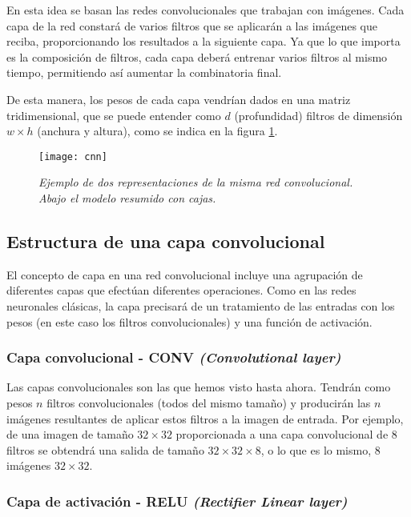 En esta idea se basan las redes convolucionales que trabajan con imágenes. Cada capa de la red constará de varios filtros que se aplicarán a las imágenes que reciba, proporcionando los resultados a la siguiente capa. Ya que lo que importa es la composición de filtros, cada capa deberá entrenar varios filtros al mismo tiempo, permitiendo así aumentar la combinatoria final.

De esta manera, los pesos de cada capa vendrían dados en una matriz tridimensional, que se puede entender como $d$ (profundidad) filtros de dimensión  $w \times h$ (anchura y altura), como se indica en la figura \ref{cnn_basic}.

\begin{figure}
    \centering
    \caption{\textit{Ejemplo de dos representaciones de la misma red convolucional. Abajo el modelo resumido con cajas.}}
  \label{cnn_basic}
  \texttt{[image: cnn]}
\end{figure}


\subsection{Estructura de una capa convolucional}

El concepto de capa en una red convolucional incluye una agrupación de diferentes capas que efectúan diferentes operaciones. Como en las redes neuronales clásicas, la capa precisará de un tratamiento de las entradas con los pesos (en este caso los filtros convolucionales) y una función de activación.

\subsubsection{Capa convolucional - CONV \textit{(Convolutional layer)}}

Las capas convolucionales son las que hemos visto hasta ahora. Tendrán como pesos $n$ filtros convolucionales (todos del mismo tamaño) y producirán las $n$ imágenes resultantes de aplicar estos filtros a la imagen de entrada. Por ejemplo, de una imagen de tamaño $32\times 32$ proporcionada a una capa convolucional de 8 filtros se obtendrá una salida de tamaño $32 \times 32 \times 8$, o lo que es lo mismo, 8 imágenes $32 \times 32$.

\subsubsection{Capa de activación - RELU \textit{(Rectifier Linear layer)}}
\label{sec:relu}

